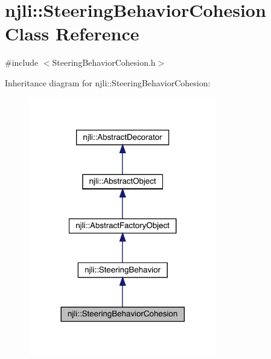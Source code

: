 \hypertarget{classnjli_1_1_steering_behavior_cohesion}{}\section{njli\+:\+:Steering\+Behavior\+Cohesion Class Reference}
\label{classnjli_1_1_steering_behavior_cohesion}


{\ttfamily \#include $<$Steering\+Behavior\+Cohesion.\+h$>$}



Inheritance diagram for njli\+:\+:Steering\+Behavior\+Cohesion\+:\nopagebreak
\begin{figure}[H]
\begin{center}
\leavevmode
\includegraphics[width=233pt]{classnjli_1_1_steering_behavior_cohesion__inherit__graph}
\end{center}
\end{figure}


